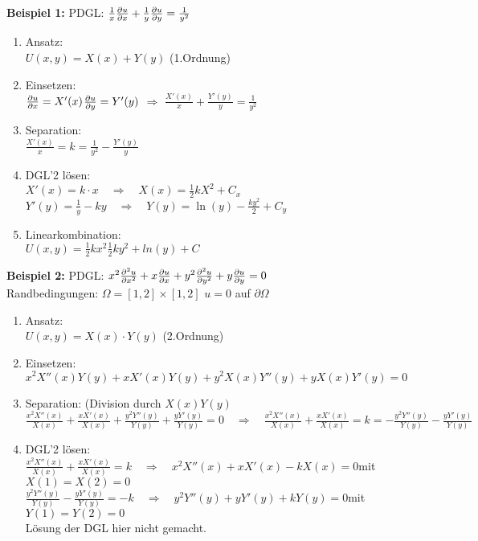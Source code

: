 \begin{minipage}{0.49\textwidth}
\textbf{Beispiel 1: } PDGL: $\frac1x\frac{\partial u}{\partial x}+\frac1y\frac{\partial u}{\partial y}=\frac{1}{y^2}$
\begin{enumerate}
	\item Ansatz:\\[0.4cm]
	$U(x,y)=X(x) + Y(y)$ (1.Ordnung)
	\item Einsetzen:\\[0.4cm]
	$\frac{\partial u}{\partial x}=X'(x)$\qquad $\frac{\partial u}{\partial y}=Y'(y)$ \quad $\Rightarrow$ \quad $\frac{X'(x)}{x}+\frac{Y'(y)}{y}=\frac{1}{y^2}$
	\item Separation:\\[0.4cm]
	$\frac{X'(x)}{x}=k=\frac{1}{y^2}-\frac{Y'(y)}{y}$
	\item DGL'2 lösen:\\[0.4cm]
	$X'(x)=k\cdot x \quad\Rightarrow\quad X(x)=\frac12 kX^2+C_x$\\
	$Y'(y)=\frac1y-ky \quad\Rightarrow\quad Y(y)=\ln(y)-\frac{ky^2}{2}+C_y$
	\item Linearkombination:\\[0.4cm]
	$U(x,y)=\frac12 kx^2\frac12 ky^2+ln(y)+C$
\end{enumerate}
\textbf{Beispiel 2: } PDGL: $x^2\frac{\partial ^2u}{\partial x^2}+x\frac{\partial u}{\partial x}+y^2\frac{\partial ^2u}{\partial y^2}+y\frac{\partial u}{\partial y}=0$\\ 
Randbedingungen: $\Omega=[1,2]\times[1,2]$ \qquad $u=0$ auf $\partial\Omega$
\begin{enumerate}
	\item Ansatz:\\[0.4cm]
	$U(x,y)=X(x) \cdot Y(y)$ (2.Ordnung)
	\item Einsetzen:\\[0.4cm]
	$x^2X''(x)Y(y)+xX'(x)Y(y)+y^2X(x)Y''(y)+yX(x)Y'(y)=0$
	\item Separation: (Division durch $X(x)Y(y)$\\[0.4cm]
	$\frac{x^2X''(x)}{X(x)}+\frac{xX'(x)}{X(x)}+\frac{y^2Y''(y)}{Y(y)}+\frac{yY'(y)}{Y(y)}=0\quad\Rightarrow\quad \frac{x^2X''(x)}{X(x)}+\frac{xX'(x)}{X(x)}=k=-\frac{y^2Y''(y)}{Y(y)}-\frac{yY'(y)}{Y(y)}$
	\item DGL'2 lösen:\\[0.4cm]
	$\frac{x^2X''(x)}{X(x)}+\frac{xX'(x)}{X(x)}=k\quad\Rightarrow\quad x^2X''(x)+xX'(x)-kX(x)=0$\qquad mit $X(1)=X(2)=0$\\
	$\frac{y^2Y''(y)}{Y(y)}-\frac{yY'(y)}{Y(y)}=-k\quad\Rightarrow\quad y^2Y''(y)+yY'(y)+kY(y)=0$\qquad mit $Y(1)=Y(2)=0$\\[0.4cm]
	Lösung der DGL hier nicht gemacht.
\end{enumerate}
\end{minipage}
